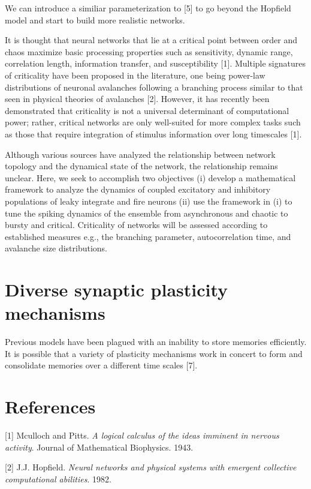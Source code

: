 \documentclass{article} %
\begin{document}
We can introduce a similiar parameterization to [5] to go beyond the Hopfield model and start to build more realistic networks. 


It is thought that neural networks that lie at a critical point between order and chaos maximize basic processing properties such as sensitivity, dynamic range, correlation length, information transfer, and susceptibility [1]. Multiple signatures of criticality have been proposed in the literature, one being power-law distributions of neuronal avalanches following a branching process similar to that seen in physical theories of avalanches [2]. However, it has recently been demonstrated that criticality is not a universal determinant of computational power; rather, critical networks are only well-suited for more complex tasks such as those that require integration of stimulus information over long timescales [1]. 

Although various sources have analyzed the relationship between network topology and the dynamical state of the network, the relationship remains unclear. Here, we seek to accomplish two objectives (i) develop a mathematical framework to analyze the dynamics of coupled excitatory and inhibitory populations of leaky integrate and fire neurons (ii) use the framework in (i) to tune the spiking dynamics of the ensemble from asynchronous and chaotic to bursty and critical. Criticality of networks will be assessed according to established measures e.g., the branching parameter, autocorrelation time, and avalanche size distributions. 

\section{Diverse synaptic plasticity mechanisms}

Previous models have been plagued with an inability to store memories efficiently. It is possible that a variety of plasticity mechanisms work in concert to form and consolidate memories over a different time scales [7].



\section*{References}

[1] Mculloch and Pitts. \textit{A logical calculus of the ideas imminent in nervous activity}. Journal of Mathematical Biophysics. 1943.

[2] J.J. Hopfield. \textit{Neural networks and physical systems with emergent collective computational abilities}. 1982.
\end{document}
